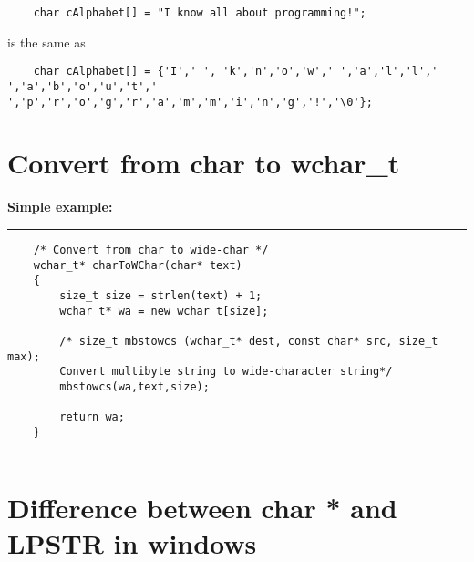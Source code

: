 	\begin{verbatim}
	char cAlphabet[] = "I know all about programming!";
	\end{verbatim}
	
	is the same as
	\begin{verbatim}
	char cAlphabet[] = {'I',' ', 'k','n','o','w',' ','a','l','l',' ','a','b','o','u','t',' ','p','r','o','g','r','a','m','m','i','n','g','!','\0'};
	\end{verbatim}
	
	\section{Convert from char to wchar\_t}
	\textbf{Simple example:}
	
	\noindent\vspace{1em}\hrule
	\begin{verbatim}
	/* Convert from char to wide-char */
	wchar_t* charToWChar(char* text)
	{
	    size_t size = strlen(text) + 1;
	    wchar_t* wa = new wchar_t[size];
	
	    /* size_t mbstowcs (wchar_t* dest, const char* src, size_t max);
	    Convert multibyte string to wide-character string*/
	    mbstowcs(wa,text,size);
	
	    return wa;
	}
	\end{verbatim}
	\noindent\hrule\vspace{1em}
	
	\section{Difference between char * and LPSTR in windows}
	
